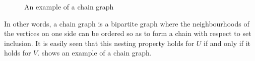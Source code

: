 \begin{figure}
    \centering
    \caption{An example of a chain graph}
    \label{tourn_fig_chain_graph_example}
\end{figure}

In other words, a chain graph is a bipartite graph where the neighbourhoods of
the vertices on one side can be ordered so as to form a chain with respect to
set inclusion. It is easily seen that this nesting property holds for $U$ if
and only if it holds for $V$.  shows an example
of a chain graph.

